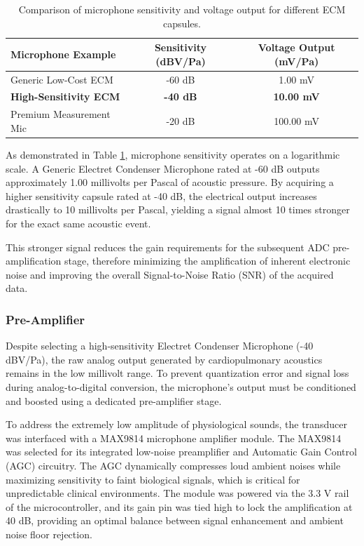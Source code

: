 \begin{table}[h]
    \centering
    \caption{Comparison of microphone sensitivity and voltage output for different ECM capsules.}
    \vspace{0.2cm}
    \begin{tabular}{lcc}
        \toprule
        \textbf{Microphone Example} & \textbf{Sensitivity (dBV/Pa)} & \textbf{Voltage Output (mV/Pa)} \\
        \midrule
        Generic Low-Cost ECM & -60 dB & 1.00 mV \\
        \textbf{High-Sensitivity ECM} & \textbf{-40 dB} & \textbf{10.00 mV} \\
        Premium Measurement Mic & -20 dB & 100.00 mV \\
        \bottomrule
    \end{tabular}
    \label{tab:sensitivity_voltage}
\end{table}

As demonstrated in Table \ref{tab:sensitivity_voltage}, microphone sensitivity operates on a logarithmic scale. A Generic Electret Condenser Microphone rated at -60 dB outputs approximately 1.00 millivolts per Pascal of acoustic pressure. By acquiring a higher sensitivity capsule rated at -40 dB, the electrical output increases drastically to 10 millivolts per Pascal, yielding a signal almost 10 times stronger for the exact same acoustic event.

This stronger signal reduces the gain requirements for the subsequent ADC pre-amplification stage, therefore minimizing the amplification of inherent electronic noise and improving the overall Signal-to-Noise Ratio (SNR) of the acquired data.

\subsubsection{Pre-Amplifier}

Despite selecting a high-sensitivity Electret Condenser Microphone (-40 dBV/Pa), the raw analog output generated by cardiopulmonary acoustics remains in the low millivolt range. To prevent quantization error and signal loss during analog-to-digital conversion, the microphone's output must be conditioned and boosted using a dedicated pre-amplifier stage. 

To address the extremely low amplitude of physiological sounds, the transducer was interfaced with a MAX9814 microphone amplifier module. The MAX9814 was selected for its integrated low-noise preamplifier and Automatic Gain Control (AGC) circuitry. The AGC dynamically compresses loud ambient noises while maximizing sensitivity to faint biological signals, which is critical for unpredictable clinical environments. The module was powered via the 3.3 V rail of the microcontroller, and its gain pin was tied high to lock the amplification at 40 dB, providing an optimal balance between signal enhancement and ambient noise floor rejection.

